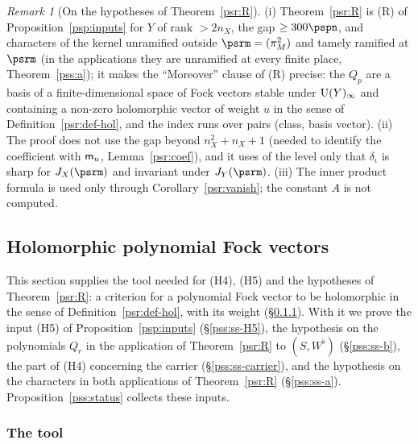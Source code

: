 \documentclass[10pt]{amsart}
\theoremstyle{definition}
\theoremstyle{remark}
\newtheorem{remark}[theorem]{Remark}
\begin{document}
\begin{remark}[On the hypotheses of Theorem~\ref{psr:R}]\label{psr:rem}
(i) Theorem~\ref{psr:R} is (R) of Proposition~\ref{psp:inputs} for $Y$ of rank $>2n_X$, the gap
$\ge300\pspn$, and characters of the kernel unramified outside $\psrm=(\pi_M^2)$ and tamely ramified at
$\psrm$ (in the applications they are unramified at every finite place, Theorem~\ref{pss:a}); it makes the ``Moreover'' clause of (R) precise: the $Q_p$ are a basis of a
finite-dimensional space of Fock vectors stable under $\auU(Y)_\infty$ and containing a non-zero
holomorphic vector of weight $u$ in the sense of Definition~\ref{psr:def-hol}, and the index runs over
pairs (class, basis vector). (ii) The proof does not use the gap beyond $n_X^2+n_X+1$ (needed to identify
the coefficient with $\pspm_u$, Lemma~\ref{psr:coef}), and it uses of the level only that $\delta_\iota$
is sharp for $J_X(\psrm)$ and invariant under $J_Y(\psrm)$. (iii) The inner product formula is used only
through Corollary~\ref{psr:vanish}; the constant $A$ is not computed.
\end{remark}




\providecommand{\auU}{\mathrm U}
\providecommand{\auGL}{\mathrm{GL}}
\providecommand{\auHom}{\operatorname{Hom}}
\providecommand{\auA}{\mathbb A}
\providecommand{\aubar}[1]{\overline{#1}}
\providecommand{\pspG}{G_\infty}
\providecommand{\pspm}{\mathsf m}
\providecommand{\pcMat}{\mathrm M}
\providecommand{\pssg}{\mathfrak g}
\providecommand{\pop}{\mathsf p}

\subsection{Holomorphic polynomial Fock vectors}\label{pss:sec}

This section supplies the tool needed for (H4), (H5) and the hypotheses of Theorem~\ref{psr:R}: a
criterion for a polynomial Fock vector to be holomorphic in the sense of
Definition~\ref{psr:def-hol}, with its weight (\S\ref{pss:ss-tool}). With it we prove the input
(H5) of Proposition~\ref{psp:inputs} (\S\ref{pss:ss-H5}), the hypothesis on the polynomials $Q_r$ in
the application of Theorem~\ref{psr:R} to $(S,W^\flat)$ (\S\ref{pss:ss-b}), the part of (H4) concerning
the carrier (\S\ref{pss:ss-carrier}), and the hypothesis on the characters in both applications of
Theorem~\ref{psr:R} (\S\ref{pss:ss-a}). Proposition~\ref{pss:status} collects these inputs.

\subsubsection{The tool}\label{pss:ss-tool}
\end{document}
